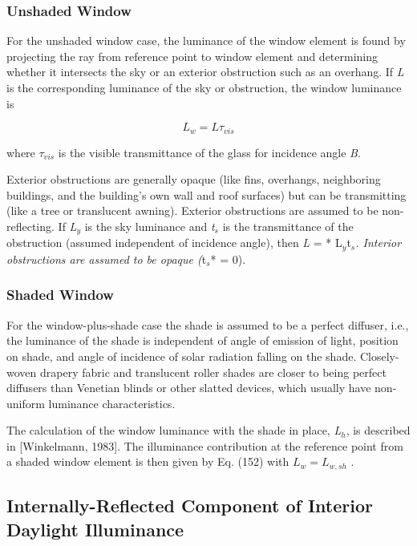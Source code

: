 \subsubsection{Unshaded Window}\label{unshaded-window}

For the unshaded window case, the luminance of the window element is found by projecting the ray from reference point to window element and determining whether it intersects the sky or an exterior obstruction such as an overhang. If \emph{L} is the corresponding luminance of the sky or obstruction, the window luminance is

\begin{equation}
{L_w} = L{\tau_{vis}}
\end{equation}

where \({\tau_{vis}}\) is the visible transmittance of the glass for incidence angle \emph{B}.

Exterior obstructions are generally opaque (like fins, overhangs, neighboring buildings, and the building's own wall and roof surfaces) but can be transmitting (like a tree or translucent awning). Exterior obstructions are assumed to be non-reflecting. If \emph{L\(_{y}\)} is the sky luminance and \emph{t\(_{s}\)} is the transmittance of the obstruction (assumed independent of incidence angle), then \emph{L} = * L\(_{y}\)t\(_{s}\)\emph{. Interior obstructions are assumed to be opaque (}t\(_{s}\)* = 0).

\subsubsection{Shaded Window}\label{shaded-window}

For the window-plus-shade case the shade is assumed to be a perfect diffuser, i.e., the luminance of the shade is independent of angle of emission of light, position on shade, and angle of incidence of solar radiation falling on the shade. Closely-woven drapery fabric and translucent roller shades are closer to being perfect diffusers than Venetian blinds or other slatted devices, which usually have non-uniform luminance characteristics.

The calculation of the window luminance with the shade in place, \emph{L\(_{h}\)}, is described in {[}Winkelmann, 1983{]}. The illuminance contribution at the reference point from a shaded window element is then given by Eq. (152) with \({L_w} = {L_{w,sh}}\) .

\subsection{Internally-Reflected Component of Interior Daylight Illuminance}\label{internally-reflected-component-of-interior-daylight-illuminance}

